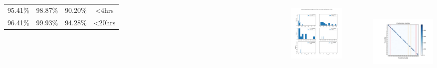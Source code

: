 \documentclass[8pt]{beamer}
\begin{document}
\begin{frame}
\begin{columns}
\begin{tabular*}{\textwidth}{|c|c|c|c|}
		\hline\hline
		95.41\% & 98.87\% & 90.20\% & \textless4hrs \\
		96.41\% & 99.93\% & 94.28\% & \textless20hrs \\
		\hline
	\end{tabular*}
	\begin{figure}
		\includegraphics[height=3.1cm, width=4.5cm]{../plots/plot_performance_histogram.png}
	\end{figure}
	\includegraphics[height=4cm, width=\textwidth]{../plots/confusion_matrix_20.png}
\end{columns}
\pause
\vspace{0.2cm}
\end{frame}
\end{document}
